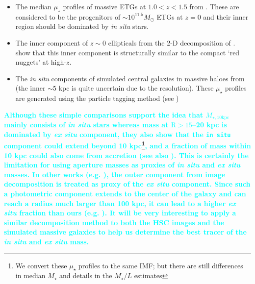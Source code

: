\documentclass[fleqn,usenatbib]{mnras}
\def\mstar{{$M_{\star}$}}
\def\minn{{$M_{\star,10\mathrm{kpc}}$}}
\def\m2l{{$M_{\star}/L$}}
\def\mden{{$\mu_{\star}$}}
\newcommand{\song}[1]{\textcolor{cyan}{\textbf{#1}}}
\begin{document}
    \begin{itemize}
        
    \item The median \mden{} profiles of massive ETGs at $1.0 < z < 1.5$ from
            \citealt{Patel2013}.
            These are considered to be the progenitors of 
            ${\sim} 10^{11.5} M_{\odot}$ ETGs at $z=0$ and their inner region 
            should be dominated by \textit{in situ} stars. 
    
        \item The inner component of $z{\sim} 0$ ellipticals from the 2-D 
            decomposition of \citet{Huang2013a}. 
            \citet{Huang2013b} show that this inner component is structurally 
            similar to the compact `red nuggets' at high-$z$. 
            
        \item The \textit{in situ} components of simulated central galaxies in 
            massive haloes from \citet{Cooper2013} (the inner ${\sim} 5$ kpc is 
            quite uncertain due to the resolution).  
            These \mden{} profiles are generated using the particle tagging 
            method (see \citealt{Cooper2010})
    
    \end{itemize}
    
    \song{
    Although these simple comparisons support the idea that \minn{} mainly consists 
    of \textit{in situ} stars whereas mass at $\mathrm{R} > 15$--20 kpc is dominated 
    by \textit{ex situ} component, they also show that the \texttt{in situ} component 
    could extend beyond 10 kpc\footnote{We convert these \mden{} profiles to the same 
    \citealt{Chabrier2003} IMF; but there are still differences in median \mstar{} 
    and details in the \m2l{} estimates}, and a fraction of mass within 10 kpc could 
    also come from accretion (see also \citealt{RodriguezGomez2016}). 
    This is certainly the limitation for using aperture masses as proxies of 
    \textit{in situ} and \textit{ex situ} masses. 
    In other works (e.g. \citealt{Huang2013a, Spavone2017}), 
    the outer component from image decomposition is treated as proxy of the 
    \textit{ex situ} component. 
    Since such a photometric component extends to the center of the galaxy and can 
    reach a radius much larger than 100 kpc, it can lead to a higher \textit{ex situ}
    fraction than ours (e.g. \citealt{Spavone2017}). 
    It will be very interesting to apply a similar decomposition method to both the 
    HSC images and the simulated massive galaxies to help us determine the 
    best tracer of the \textit{in situ} and \textit{ex situ} mass.
    }
\end{document}
